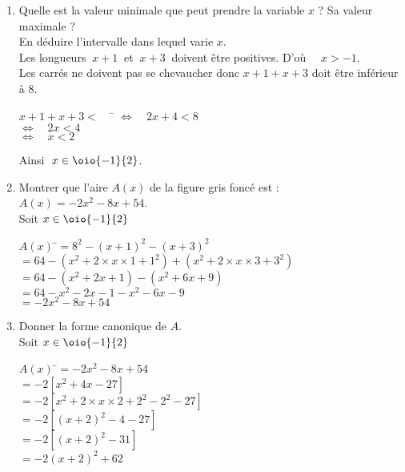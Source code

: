\documentclass[a4paper,11pt,exos]{nsi}
\begin{document}
\begin{enumerate}
	\item 	\textcolor{UGLiBlue}{Quelle est la valeur minimale que peut prendre la variable $x$ ? Sa valeur maximale ?\\
    En déduire l'intervalle dans lequel varie $x$.}\\[.5em]
	Les longueurs $\ x+1\ $ et $\ x+3\ $ doivent être positives. D'où $\quad x>-1$.\\
	Les carrés ne doivent pas se chevaucher donc $x+1+x+3$ doit être inférieur à $8$.
	\begin{tabbing}
		$x+1+x+3< \quad$	\= $\iff \quad 2x+4<8$\\
		\>	$\iff \quad 2x<4$\\
		\>	$\iff \quad x<2$
	\end{tabbing}
	Ainsi $\ x\in\oio{-1}{2}$.
	
	\item 	\textcolor{UGLiBlue}{Montrer que l'aire $A(x)$ de la figure gris foncé est : $A(x)=-2x^2-8x+54$.}\\[.5em]
	Soit $x\in\oio{-1}{2}$
	\begin{tabbing}
		$A(x)$	\=$=8^2-(x+1)^2-(x+3)^2$\\
		\>	$=64-(x^2+2\times x\times 1+1^2)+(x^2+2\times x\times 3+3^2)$\\
		\>	$= 64-(x^2+2x+1)-(x^2+6x+9)$\\
		\>	$=64-x^2-2x-1-x^2-6x-9$\\
		\>	$=-2x^2-8x+54$
	\end{tabbing}

   
    \item \textcolor{UGLiBlue}{Donner la forme canonique de $A$.}\\[.5em]
	Soit $x\in\oio{-1}{2}$
	\begin{tabbing}
		$A(x)$	\=$=-2x^2-8x+54$\\
		\>	$=-2\left[x^2+4x-27\right]$\\
		\>	$= -2\left[x^2+2\times x\times 2+2^2-2^2-27\right]$\\
		\>	$=-2\left[(x+2)^2-4-27\right]$\\
		\>	$=-2\left[(x+2)^2-31\right]$\\
		\>	$=-2(x+2)^2+62$
	\end{tabbing}


\end{enumerate}
\end{document}
